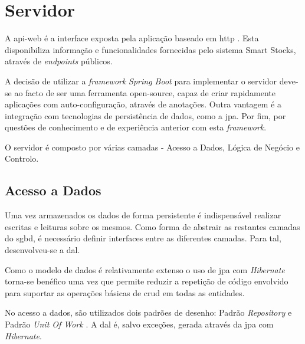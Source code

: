 \section{Servidor}\label{sec33}

A \gls{api-web} é a interface exposta pela aplicação baseado em \acrfull{http} \cite{RFC7231:http}. Esta disponibiliza informação e funcionalidades fornecidas pelo sistema Smart Stocks, através de \textit{endpoints} públicos.

A decisão de utilizar a \textit{framework} \textit{Spring Boot} para implementar o servidor deve-se ao facto de ser uma ferramenta \gls{open-source}, capaz de criar rapidamente aplicações com auto-configuração, através de anotações. Outra vantagem é a integração com tecnologias de persistência de dados, como a \acrfull{jpa}. Por fim, por questões de conhecimento e de experiência anterior com esta \textit{framework}.

O servidor é composto por várias camadas - Acesso a Dados, Lógica de Negócio e Controlo.

%
%
\subsection{Acesso a Dados}\label{subsec331}

Uma vez armazenados os dados de forma persistente é indispensável realizar escritas e leituras sobre os mesmos. Como forma de abstrair as restantes camadas do \acrshort{sgbd}, é necessário definir interfaces entre as diferentes camadas. Para tal, desenvolveu-se a \acrfull{dal}.


Como o modelo de dados é relativamente extenso o uso de \acrfull{jpa} com \textit{Hibernate} torna-se benéfico uma vez que permite reduzir a repetição de código envolvido para suportar as operações básicas de \acrfull{crud} em todas as entidades. 

No acesso a dados, são utilizados dois padrões de desenho: Padrão \textit{Repository} \cite{PofEAARe31:repositoryPattern} e Padrão \textit{Unit Of Work} \cite{PofEAAUn16:unitOfWorkPattern}. A \acrshort{dal} é, salvo exceções, gerada através da \acrshort{jpa} com \textit{Hibernate}.

